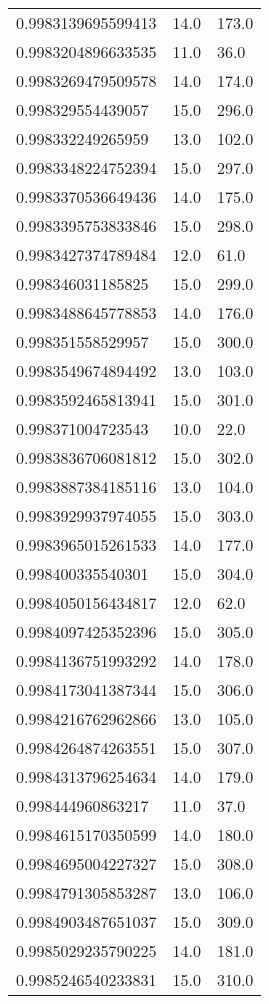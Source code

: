 \begin{center}
\begin{supertabular}[H]{p{0.30\textwidth}p{0.05\textwidth}p{0.05\textwidth}}
0.9983139695599413 & 14.0 & 173.0 \\ 
0.9983204896633535 & 11.0 & 36.0 \\ 
0.9983269479509578 & 14.0 & 174.0 \\ 
0.998329554439057 & 15.0 & 296.0 \\ 
0.998332249265959 & 13.0 & 102.0 \\ 
0.9983348224752394 & 15.0 & 297.0 \\ 
0.9983370536649436 & 14.0 & 175.0 \\ 
0.9983395753833846 & 15.0 & 298.0 \\ 
0.9983427374789484 & 12.0 & 61.0 \\ 
0.998346031185825 & 15.0 & 299.0 \\ 
0.9983488645778853 & 14.0 & 176.0 \\ 
0.998351558529957 & 15.0 & 300.0 \\ 
0.9983549674894492 & 13.0 & 103.0 \\ 
0.9983592465813941 & 15.0 & 301.0 \\ 
0.998371004723543 & 10.0 & 22.0 \\ 
0.9983836706081812 & 15.0 & 302.0 \\ 
0.9983887384185116 & 13.0 & 104.0 \\ 
0.9983929937974055 & 15.0 & 303.0 \\ 
0.9983965015261533 & 14.0 & 177.0 \\ 
0.998400335540301 & 15.0 & 304.0 \\ 
0.9984050156434817 & 12.0 & 62.0 \\ 
0.9984097425352396 & 15.0 & 305.0 \\ 
0.9984136751993292 & 14.0 & 178.0 \\ 
0.9984173041387344 & 15.0 & 306.0 \\ 
0.9984216762962866 & 13.0 & 105.0 \\ 
0.9984264874263551 & 15.0 & 307.0 \\ 
0.9984313796254634 & 14.0 & 179.0 \\ 
0.998444960863217 & 11.0 & 37.0 \\ 
0.9984615170350599 & 14.0 & 180.0 \\ 
0.9984695004227327 & 15.0 & 308.0 \\ 
0.9984791305853287 & 13.0 & 106.0 \\ 
0.9984903487651037 & 15.0 & 309.0 \\ 
0.9985029235790225 & 14.0 & 181.0 \\ 
0.9985246540233831 & 15.0 & 310.0 \\ 

\end{supertabular}
\end{center}
